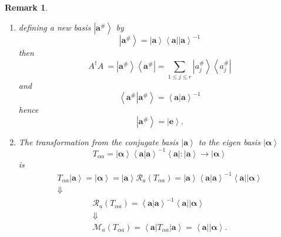 \documentclass[aps,preprint]{revtex4}%
\newtheorem{remark}[theorem]{Remark}
\begin{document}
\begin{remark}
\begin{enumerate}
\begin{enumerate}
\item defining a new basis $\left\vert \mathbf{a}^{\#}\right\rangle $ by
\begin{equation}
\left\vert \mathbf{a}^{\#}\right\rangle =\left\vert \mathbf{a}\right\rangle
\left\langle \mathbf{a}\right\vert \left\vert \mathbf{a}\right\rangle ^{-1}%
\end{equation}
then
\begin{equation}
A^{\dagger}A\ =\left\vert \mathbf{a}^{\#}\right\rangle \left\langle
\mathbf{a}^{\#}\right\vert =\sum_{1\leq j\leq r}\left\vert a_{j}%
^{\#}\right\rangle \left\langle a_{j}^{\#}\right\vert
\end{equation}
and
\begin{equation}
\left\langle \left.  \mathbf{a}^{\#}\right\vert \mathbf{a}^{\#}\right\rangle
=\left\langle \left.  \mathbf{a}\right\vert \mathbf{a}\right\rangle ^{-1}%
\end{equation}
hence
\begin{equation}
\left\vert \mathbf{a}^{\#}\right\rangle =\left\vert \mathbf{e}\right\rangle .
\end{equation}


\item The transformation from the conjugate basis $\left\vert \mathbf{a}%
\right\rangle $ to the eigen basis $\left\vert \mathbf{\alpha}\right\rangle $
\begin{equation}
T_{\alpha a}=\left\vert \mathbf{\alpha}\right\rangle \left\langle \left.
\mathbf{a}\right\vert \mathbf{a}\right\rangle ^{-1}\left\langle \mathbf{a}%
\right\vert :\left\vert \mathbf{a}\right\rangle \rightarrow\left\vert
\mathbf{\alpha}\right\rangle
\end{equation}
is
\begin{gather}
T_{\alpha a}\left\vert \mathbf{a}\right\rangle =\left\vert \mathbf{\alpha
}\right\rangle =\left\vert \mathbf{a}\right\rangle \mathcal{R}_{a}\left(
T_{\alpha a}\right)  =\left\vert \mathbf{a}\right\rangle \left\langle \left.
\mathbf{a}\right\vert \mathbf{a}\right\rangle ^{-1}\left\langle \mathbf{a}%
\right\vert \left\vert \mathbf{\alpha}\right\rangle \\
\Downarrow
\end{gather}%
\begin{gather}
\mathcal{R}_{a}\left(  T_{\alpha a}\right)  =\left\langle \left.
\mathbf{a}\right\vert \mathbf{a}\right\rangle ^{-1}\left\langle \mathbf{a}%
\right\vert \left\vert \mathbf{\alpha}\right\rangle \\
\Downarrow\\
\mathcal{M}_{a}\left(  T_{\alpha a}\right)  =\left\langle \mathbf{a}%
\right\vert T_{\alpha a}\left\vert \mathbf{a}\right\rangle =\left\langle
\mathbf{a}\right\vert \left\vert \mathbf{\alpha}\right\rangle .
\end{gather}



\end{enumerate}
\end{enumerate}
\end{remark}
\end{document}

